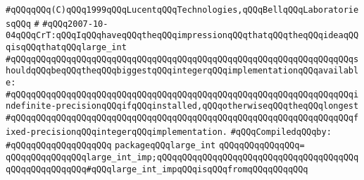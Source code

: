 \label{src/lib/std/large-int.pkg}
\verb|#qQQqqQQq(C)qQQq1999qQQqLucentqQQqTechnologies,qQQqBellqQQqLaboratoriesqQQq|\newline
\verb|#|\newline
\verb|#qQQq2007-10-04qQQqCrT:qQQqIqQQqhaveqQQqtheqQQqimpressionqQQqthatqQQqtheqQQqideaqQQqisqQQqthatqQQqlarge_int|\newline
\verb|#qQQqqQQqqQQqqQQqqQQqqQQqqQQqqQQqqQQqqQQqqQQqqQQqqQQqqQQqqQQqqQQqqQQqshouldqQQqbeqQQqtheqQQqbiggestqQQqintegerqQQqimplementationqQQqavailable:|\newline
\verb|#qQQqqQQqqQQqqQQqqQQqqQQqqQQqqQQqqQQqqQQqqQQqqQQqqQQqqQQqqQQqqQQqqQQqindefinite-precisionqQQqifqQQqinstalled,qQQqotherwiseqQQqtheqQQqlongest|\newline
\verb|#qQQqqQQqqQQqqQQqqQQqqQQqqQQqqQQqqQQqqQQqqQQqqQQqqQQqqQQqqQQqqQQqqQQqfixed-precisionqQQqintegerqQQqimplementation.|\newline
\newline
\verb|#qQQqCompiledqQQqby:|\newline
\verb|#qQQqqQQqqQQqqQQqqQQq|\newline
\newline
\verb|packageqQQqlarge_int|\newline
\verb|qQQqqQQqqQQqqQQq=|\newline
\verb|qQQqqQQqqQQqqQQqlarge_int_imp;qQQqqQQqqQQqqQQqqQQqqQQqqQQqqQQqqQQqqQQqqQQqqQQqqQQqqQQq#qQQqlarge_int_impqQQqisqQQqfromqQQqqQQqqQQq|\newline

